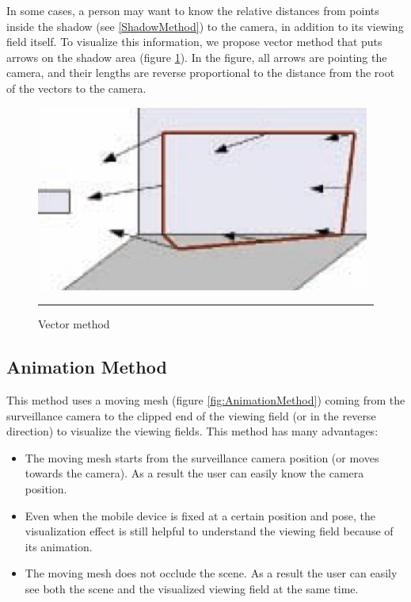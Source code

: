 In some cases, a person may want to know the relative distances from points inside the shadow (see \ref{ShadowMethod}) to the camera, in addition to its viewing field itself. To visualize this information, we propose vector method that puts arrows on the shadow area (figure \ref{fig:VectorMethod}). In the figure, all arrows are pointing the camera, and their lengths are reverse proportional to the distance from the root of the vectors to the camera.

\begin{figure}[htbp]
	\centering
	\includegraphics{./Primitives/theory_vector.png}
	\rule{35em}{0.5pt}
	\caption[Vector method]{Vector method}
	\label{fig:VectorMethod}
\end{figure}

\subsection{Animation Method}

This method uses a moving mesh (figure \ref{fig:AnimationMethod}) coming from the surveillance camera to the clipped end of the viewing field (or in the reverse direction) to visualize the viewing fields. This method has  many advantages:

\begin{itemize}
	\item The moving mesh starts from the surveillance camera position (or moves towards the camera). As a result the user can easily know the camera position.
	\item Even when the mobile device is fixed at a certain position and pose, the visualization effect is still helpful to understand the viewing field because of its animation.
	\item The moving mesh does not occlude the scene. As a result the user can easily see both the scene and the visualized viewing field at the same time.
\end{itemize}

